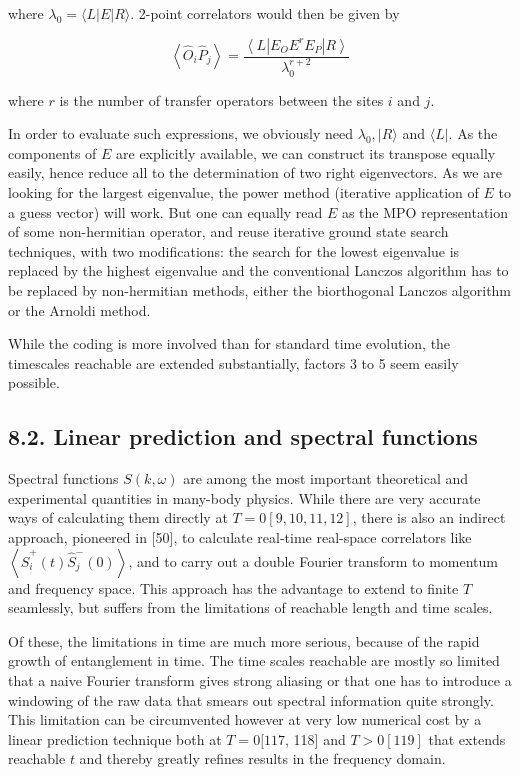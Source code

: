 \documentclass[12pt]{article}
\begin{document}
where $\lambda_{0}=\langle L|E| R\rangle$. 2-point correlators would then be given by


\begin{equation*}
\left\langle\hat{O}_{i} \hat{P}_{j}\right\rangle=\frac{\left\langle L\left|E_{O} E^{r} E_{P}\right| R\right\rangle}{\lambda_{0}^{r+2}} \tag{291}
\end{equation*}


where $r$ is the number of transfer operators between the sites $i$ and $j$.

In order to evaluate such expressions, we obviously need $\lambda_{0},|R\rangle$ and $\langle L|$. As the components of $E$ are explicitly available, we can construct its transpose equally easily, hence reduce all to the determination of two right eigenvectors. As we are looking for the largest eigenvalue, the power method (iterative application of $E$ to a guess vector) will work. But one can equally read $E$ as the MPO representation of some non-hermitian operator, and reuse iterative ground state search techniques, with two modifications: the search for the lowest eigenvalue is replaced by the highest eigenvalue and the conventional Lanczos algorithm has to be replaced by non-hermitian methods, either the biorthogonal Lanczos algorithm or the Arnoldi method.

While the coding is more involved than for standard time evolution, the timescales reachable are extended substantially, factors 3 to 5 seem easily possible.

\subsection*{8.2. Linear prediction and spectral functions}
Spectral functions $S(k, \omega)$ are among the most important theoretical and experimental quantities in many-body physics. While there are very accurate ways of calculating them directly at $T=0[9,10,11,12]$, there is also an indirect approach, pioneered in [50], to calculate real-time real-space correlators like $\left\langle\hat{S}_{i}^{+}(t) \hat{S}_{j}^{-}(0)\right\rangle$, and to carry out a double Fourier transform to momentum and frequency space. This approach has the advantage to extend to finite $T$ seamlessly, but suffers from the limitations of reachable length and time scales.

Of these, the limitations in time are much more serious, because of the rapid growth of entanglement in time. The time scales reachable are mostly so limited that a naive Fourier transform gives strong aliasing or that one has to introduce a windowing of the raw data that smears out spectral information quite strongly. This limitation can be circumvented however at very low numerical cost by a linear prediction technique both at $T=0[117$, 118] and $T>0[119]$ that extends reachable $t$ and thereby greatly refines results in the frequency domain.
\end{document}
